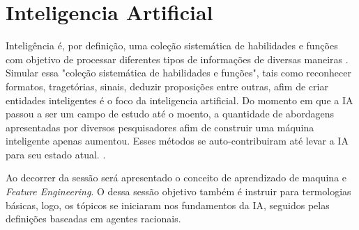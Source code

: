 \section{Inteligencia Artificial}

Inteligência é, por definição, uma coleção sistemática de habilidades e funções com objetivo de processar diferentes tipos de informações de diversas maneiras \cite[49]{guilford1982cognitive}. Simular essa "coleção sistemática de habilidades e funções", tais como reconhecer formatos, tragetórias, sinais, deduzir proposições entre outras, afim de criar entidades inteligentes é o foco da inteligencia artificial. Do momento em que a IA passou a ser um campo de estudo até o moento, a quantidade de abordagens apresentadas por diversos pesquisadores afim de construir uma máquina inteligente apenas aumentou. Esses métodos se auto-contribuiram até levar a IA para seu estado atual. \cite[1-2]{russell2003artificial}.

Ao decorrer da sessão será apresentado o conceito de aprendizado de maquina e \textit{Feature Engineering}. O dessa sessão objetivo também é instruir para termologias básicas, logo, os tópicos se iniciaram nos fundamentos da IA, seguidos pelas definições baseadas em agentes racionais.



